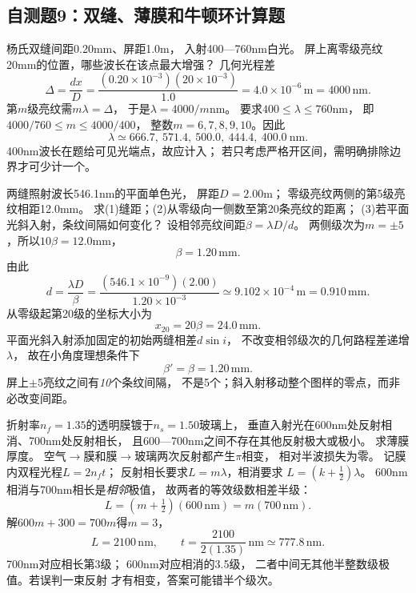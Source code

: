 \subsection{自测题9：双缝、薄膜和牛顿环计算题}

\problemtext 杨氏双缝间距0.20mm、屏距1.0m，
入射400—760nm白光。
屏上离零级亮纹20mm的位置，哪些波长在该点最大增强？
\workings
几何光程差
\[
\Delta=\frac{dx}{D}
=\frac{(0.20\times10^{-3})(20\times10^{-3})}{1.0}
=4.0\times10^{-6}\,\mathrm m=4000\,\mathrm{nm}.
\]
第$m$级亮纹需$m\lambda=\Delta$，
于是$\lambda=4000/m$nm。
要求$400\le\lambda\le760$nm，
即$4000/760\le m\le4000/400$，
整数$m=6,7,8,9,10$。因此
\[
\boxed{\lambda\simeq666.7,\ 571.4,\ 500.0,\ 444.4,\ 400.0\ \mathrm{nm}}.
\]
\crosscheck 400nm波长在题给可见光端点，故应计入；
若只考虑严格开区间，需明确排除边界才可少计一个。

\problemtext 两缝照射波长546.1nm的平面单色光，
屏距$D=2.00$m；
零级亮纹两侧的第5级亮纹相距12.0mm。
求(1)缝距；(2)从零级向一侧数至第20条亮纹的距离；
(3)若平面光斜入射，条纹间隔如何变化？
\workings
设相邻亮纹间距$\beta=\lambda D/d$。
两侧级次为$m=\pm5$，所以$10\beta=12.0$mm，
\[
\beta=1.20\,\mathrm{mm}.
\]
由此
\[
\boxed{d=\frac{\lambda D}{\beta}
=\frac{(546.1\times10^{-9})(2.00)}
{1.20\times10^{-3}}
\simeq9.102\times10^{-4}\,\mathrm m=0.910\,\mathrm{mm}}.
\]
从零级起第20级的坐标大小为
\[
\boxed{x_{20}=20\beta=24.0\,\mathrm{mm}}.
\]
平面光斜入射添加固定的初始两缝相差$d\sin i$，
不改变相邻级次的几何路程差递增$\lambda$，
故在小角度理想条件下
\[
\boxed{\beta'=\beta=1.20\,\mathrm{mm}}.
\]
\crosscheck 屏上$\pm5$亮纹之间有\emph{10}个条纹间隔，
不是5个；斜入射移动整个图样的零点，而非必改变间距。

\problemtext 折射率$n_f=1.35$的透明膜镀于$n_s=1.50$玻璃上，
垂直入射光在600nm处反射相消、700nm处反射相长，
且600—700nm之间不存在其他反射极大或极小。
求薄膜厚度。
\workings
空气$\to$膜和膜$\to$玻璃两次反射都产生$\pi$相变，
相对半波损失为零。
记膜内双程光程$L=2n_ft$；
反射相长要求$L=m\lambda$，相消要求
$L=(k+\tfrac12)\lambda$。
600nm相消与700nm相长是\emph{相邻}极值，
故两者的等效级数相差半级：
\[
 L=(m+\tfrac12)(600\,\mathrm{nm})
 =m(700\,\mathrm{nm}).
\]
解$600m+300=700m$得$m=3$，
\[
\boxed{L=2100\,\mathrm{nm}},\qquad
\boxed{t=\frac{2100}{2(1.35)}\,\mathrm{nm}
\simeq777.8\,\mathrm{nm}}.
\]
\crosscheck 700nm对应相长第3级；
600nm对应相消的3.5级，
二者中间无其他半整数级极值。若误判一束反射
才有相变，答案可能错半个级次。

